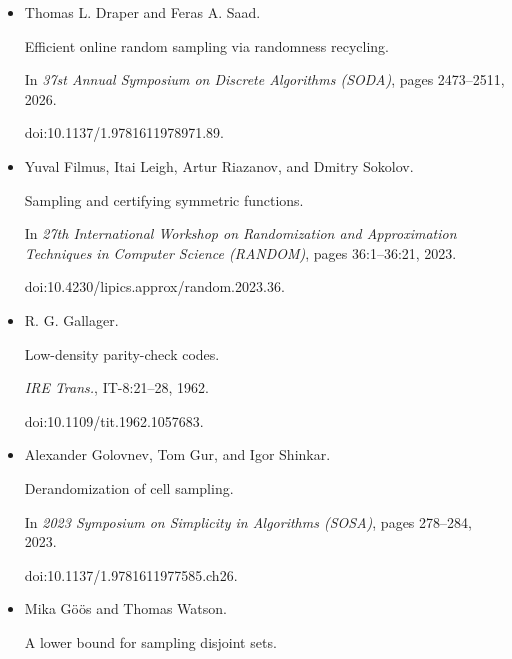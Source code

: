 \begin{itemize}
doi:10.1145/1806689.1806771.





\item[] 
[16]

Thomas L. Draper and Feras A. Saad.


Efficient online random sampling via randomness recycling.


In \emph{37st Annual Symposium on Discrete Algorithms (SODA)}, pages
2473–2511, 2026.


doi:10.1137/1.9781611978971.89.





\item[] 
[17]

Yuval Filmus, Itai Leigh, Artur Riazanov, and Dmitry Sokolov.


Sampling and certifying symmetric functions.


In \emph{27th International Workshop on Randomization and
Approximation Techniques in Computer Science (RANDOM)}, pages 36:1–36:21,
2023.


doi:10.4230/lipics.approx/random.2023.36.





\item[] 
[18]

R. G. Gallager.


Low-density parity-check codes.


\emph{IRE Trans.}, IT-8:21–28, 1962.


doi:10.1109/tit.1962.1057683.





\item[] 
[19]

Alexander Golovnev, Tom Gur, and Igor Shinkar.


Derandomization of cell sampling.


In \emph{2023 Symposium on Simplicity in Algorithms (SOSA)}, pages
278–284, 2023.


doi:10.1137/1.9781611977585.ch26.





\item[] 
[20]

Mika Göös and Thomas Watson.


A lower bound for sampling disjoint sets.



\end{itemize}
